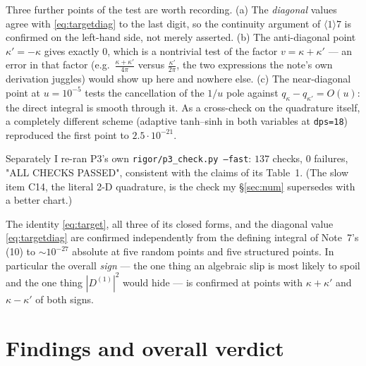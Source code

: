 \documentclass[11pt]{article}
\begin{document}
Three further points of the test are worth recording.  (a) The \emph{diagonal} values agree with
\eqref{eq:targetdiag} to the last digit, so the continuity argument of \(\langle1\rangle7\) is
confirmed on the left-hand side, not merely asserted.  (b) The anti-diagonal point
\(\kappa'=-\kappa\) gives exactly \(0\), which is a nontrivial test of the factor
\(v=\kappa+\kappa'\) --- an error in that factor (e.g.\ \(\frac{\kappa+\kappa'}{4\pi}\) versus
\(\frac{\kappa'}{2\pi}\), the two expressions the note's own derivation juggles) would show up
here and nowhere else.  (c) The near-diagonal point at \(u=10^{-5}\) tests the cancellation of the
\(1/u\) pole against \(q_\kappa-q_{\kappa'}=O(u)\): the direct integral is smooth through it.
As a cross-check on the quadrature itself, a completely different scheme (adaptive tanh--sinh in
both variables at \texttt{dps=18}) reproduced the first point to \(2.5\cdot10^{-21}\).

Separately I re-ran P3's own \texttt{rigor/p3\_check.py --fast}: \(137\) checks, \(0\) failures,
"ALL CHECKS PASSED", consistent with the claims of its Table~1.  (The slow item C14, the literal
2-D quadrature, is the check my \S\ref{sec:num} supersedes with a better chart.)

\begin{verdictok}
The identity \eqref{eq:target}, all three of its closed forms, and the diagonal value
\eqref{eq:targetdiag} are confirmed independently from the defining integral of Note~7's (10) to
\(\sim10^{-27}\) absolute at five random points and five structured points.  In particular the
overall \emph{sign} --- the one thing an algebraic slip is most likely to spoil and the one thing
\(|D^{(1)}|^2\) would hide --- is confirmed at points with \(\kappa+\kappa'\) and
\(\kappa-\kappa'\) of both signs.
\end{verdictok}

\section{Findings and overall verdict}\label{sec:findings}
\end{document}
